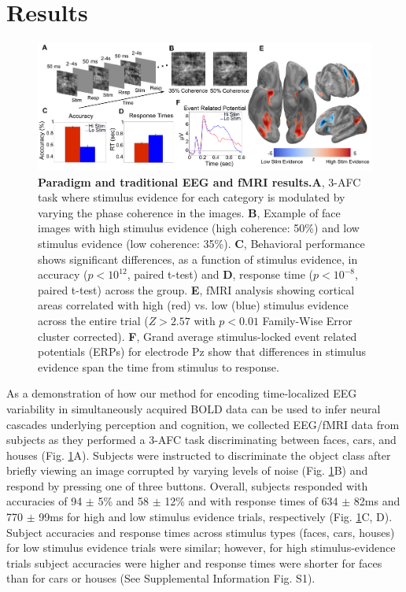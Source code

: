 \section*{Results}
\begin{figure}[htbp!]
\centering
\includegraphics[width=1\textwidth]{Fig2.png}

\caption{ \textbf{Paradigm and traditional EEG and fMRI results.}\textbf{A}, 3-AFC task where stimulus evidence for each category is modulated by varying the phase coherence in the images. \textbf{B}, Example of face images with high stimulus evidence (high  coherence: 50\%) and low stimulus evidence (low coherence: 35\%). \textbf{C}, Behavioral performance shows significant differences, as a function of stimulus evidence, in accuracy ($p< 10^{12}$, paired t-test) and \textbf{D}, response time ($p< 10^{-8}$, paired t-test) across the group. \textbf{E}, fMRI analysis showing cortical areas correlated with high (red) vs. low (blue) stimulus evidence across the entire trial ($Z> 2.57$ with  $p< 0.01$ Family-Wise Error cluster corrected). \textbf{F}, Grand average stimulus-locked event related potentials (ERPs) for electrode Pz show that differences in stimulus evidence span the time from stimulus to response.}
\label{fig:TradResults}
\end{figure}
As a demonstration of how our method for encoding time-localized EEG variability in simultaneously acquired BOLD data can be used to infer neural cascades underlying perception and cognition, we collected EEG/fMRI data from subjects as they performed a 3-AFC task discriminating between faces, cars, and houses (Fig. \ref{fig:TradResults}A). Subjects were instructed to discriminate the object class after briefly viewing an image corrupted by varying levels of noise (Fig. \ref{fig:TradResults}B) and respond by pressing one of three buttons.  Overall, subjects responded with accuracies of 94 $\pm$ 5\% and 58 $\pm$ 12\% and with response times of 634 $\pm$ 82ms and 770 $\pm$ 99ms for high and low stimulus evidence trials, respectively (Fig. \ref{fig:TradResults}C, D). Subject accuracies and response times across stimulus types (faces, cars, houses) for low stimulus evidence trials were similar; however, for high stimulus-evidence trials subject accuracies were higher and response times were shorter for faces than for cars or houses (See Supplemental Information Fig. S1). 

